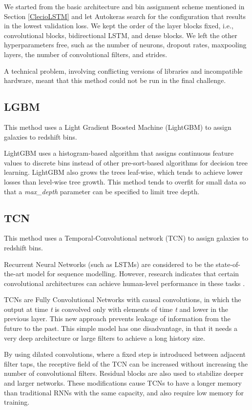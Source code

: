 \documentclass[twocolumn,twocolappendix]{aastex63}
\begin{document}
We started from the basic architecture and bin assignment scheme mentioned in Section
\ref{ClecioLSTM} and let Autokeras search for the configuration that results in the lowest
validation loss. We kept the order of the layer blocks fixed, i.e., convolutional blocks,
bidirectional LSTM, and dense blocks. We left the other hyperparameters free, such as the number of
neurons,  dropout rates, maxpooling layers, the number of convolutional filters, and strides.

A technical problem, involving conflicting versions of libraries and incompatible hardware,
meant that this method could not be run in the final challenge.


\subsection{ {\sc LGBM} }
This method uses a Light Gradient Boosted Machine (LightGBM) \citep{lgbm} to assign galaxies to
redshift bins.
 
LightGBM uses a histogram-based algorithm that assigns continuous feature values to discrete bins
instead of other pre-sort-based algorithms for decision tree learning. LightGBM also grows the trees
leaf-wise, which tends to achieve lower losses than level-wise tree growth. This method tends to
overfit for small data so that a \textit{max\_depth} parameter can be specified to limit tree depth.

 
 
\subsection{ {\sc TCN}}
This method uses a Temporal-Convolutional network (TCN) \citep{baitcn} to assign galaxies to redshift
bins.
 
Recurrent Neural Networks (such as LSTMs) are considered to be the state-of-the-art model for
sequence modelling. However, research indicates that certain convolutional architectures can achieve
human-level performance in these tasks \citep{dauphin}.
 
TCNs are Fully Convolutional Networks with causal convolutions, in which the output at time
\textit{t} is convolved only with elements of time \textit{t} and lower in the previous layer. This
new approach prevents leakage of information from the future to the past. This simple model has one
disadvantage, in that it needs a very deep architecture or large filters to achieve a long history
size. 
 
By using dilated convolutions, where a fixed step is introduced between adjacent filter taps, the
receptive field of the TCN can be increased without increasing the number of convolutional filters.
Residual blocks \citep{resnet} are also used to stabilize deeper and larger networks. These
modifications cause TCNs to have a longer memory than traditional RNNs with the same capacity,  and
also require low memory for training.
 
\end{document}
